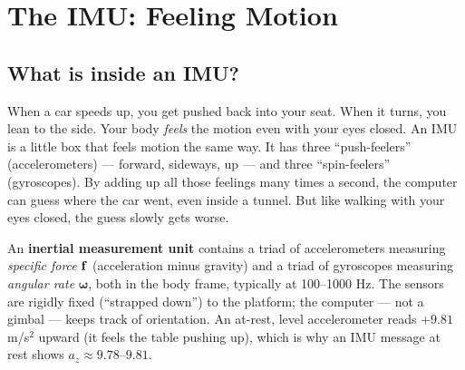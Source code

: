 \chapter{The IMU: Feeling Motion}

\section{What is inside an IMU?}
\begin{kid}
When a car speeds up, you get pushed back into your seat. When it turns, you lean to the side. Your body \emph{feels} the motion even with your eyes closed. An IMU is a little box that feels motion the same way. It has three ``push-feelers'' (accelerometers) --- forward, sideways, up --- and three ``spin-feelers'' (gyroscopes). By adding up all those feelings many times a second, the computer can guess where the car went, even inside a tunnel. But like walking with your eyes closed, the guess slowly gets worse.
\end{kid}


\begin{eng}
An \textbf{inertial measurement unit} contains a triad of accelerometers measuring \emph{specific force} $\mathbf{f}$ (acceleration minus gravity) and a triad of gyroscopes measuring \emph{angular rate} $\boldsymbol\omega$, both in the body frame, typically at 100--1000 Hz. The sensors are rigidly fixed (``strapped down'') to the platform; the computer --- not a gimbal --- keeps track of orientation. An at-rest, level accelerometer reads $+9.81$ m/s$^2$ upward (it feels the table pushing up), which is why an IMU message at rest shows $a_z\approx9.78$--$9.81$.
\end{eng}

